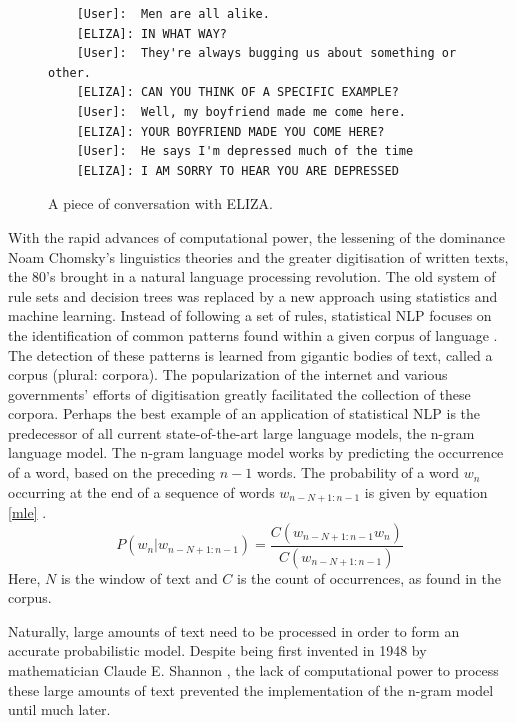 \documentclass[twoside]{uva-inf-bachelor-thesis}
\begin{document}
\begin{figure}[h]
    \begin{verbatim}
    [User]:  Men are all alike.
    [ELIZA]: IN WHAT WAY?
    [User]:  They're always bugging us about something or other. 
    [ELIZA]: CAN YOU THINK OF A SPECIFIC EXAMPLE?
    [User]:  Well, my boyfriend made me come here.
    [ELIZA]: YOUR BOYFRIEND MADE YOU COME HERE?
    [User]:  He says I'm depressed much of the time
    [ELIZA]: I AM SORRY TO HEAR YOU ARE DEPRESSED
    \end{verbatim}
    \caption{A piece of conversation with ELIZA. \cite{weizenbaum66}}
    \label{fig:eliza-conv}
\end{figure}


With the rapid advances of computational power, the lessening of the dominance Noam Chomsky's linguistics theories and the greater digitisation of written texts, the 80's brought in a natural language processing revolution. The old system of rule sets and decision trees was replaced by a new approach using statistics and machine learning. Instead of following a set of rules, statistical NLP focuses on the identification of common patterns found within a given corpus of language \cite{Manning99}. The detection of these patterns is learned from gigantic bodies of text, called a corpus (plural: corpora). The popularization of the internet and various governments' efforts of digitisation greatly facilitated the collection of these corpora. 
Perhaps the best example of an application of statistical NLP is the predecessor of all current state-of-the-art large language models, the n-gram language model. The n-gram language model works by predicting the occurrence of a word, based on the preceding $n-1$ words. The probability of a word $w_n$ occurring at the end of a sequence of words $w_{n-N+1 : n-1}$ is given by equation \ref{mle} \cite{brown92, Manning99}.
\begin{equation} \label{mle}
    P(w_{n} | w_{n-N+1 : n-1}) = \frac{C(w_{n-N+1 : n-1} w_{n})}{C(w_{n-N+1 : n-1})}
\end{equation}
Here, $N$ is the window of text and $C$ is the count of occurrences, as found in the corpus. 

Naturally, large amounts of text need to be processed in order to form an accurate probabilistic model. Despite being first invented in 1948 by mathematician Claude E. Shannon \cite{shannon48}, the lack of computational power to process these large amounts of text prevented the implementation of the n-gram model until much later.
\end{document}

